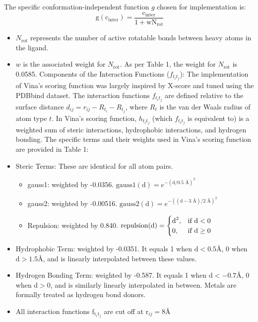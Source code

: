 \documentclass[11pt]{article}
\begin{document}
The specific conformation-independent function $g$ chosen for implementation is: 
\begin{equation} \label{eq:vinascoring-3}
\ \text{g}(\text{c}_{\text{inter}}) = \frac{\text{c}_{\text{inter}}}{1 + \text{wN}_{\text{rot}}}
\end{equation}
\begin{itemize}
\item $N_{\text{rot}}$ represents the number of active rotatable bonds between heavy atoms in the ligand.
\item $w$ is the associated weight for $N_{\text{rot}}$. As per Table 1, the weight for $N_{\text{rot}}$ is 0.0585.
Components of the Interaction Functions ($f_{t_i t_j}$): The implementation of Vina's scoring function was largely inspired by X-score and tuned using the PDBbind dataset. The interaction functions $f_{t_i t_j}$ are defined relative to the surface distance $d_{ij} = r_{ij} - R_{t_i} - R_{t_j}$, where $R_t$ is the van der Waals radius of atom type $t$. In Vina's scoring function, $h_{t_i t_j}$ (which $f_{t_i t_j}$ is equivalent to) is a weighted sum of steric interactions, hydrophobic interactions, and hydrogen bonding.
The specific terms and their weights used in Vina's scoring function are provided in Table 1:
\item Steric Terms: These are identical for all atom pairs.
\begin{itemize}
    \item gauss1: weighted by -0.0356. $\text{gauss1}(\text{d}) = e^{-(\text{d}/0.5\text{ Å})^2}$
    \item gauss2: weighted by -0.00516. $\text{gauss2}(\text{d}) = e^{-((\text{d}-3\text{ Å})/2\text{ Å})^2}$
    \item Repulsion: weighted by 0.840. $ \text{repulsion}(\text{d}) = 
                        \begin{cases} 
                        \text{d}^2, & \text{if } \text{d} < 0 \cr 0, & \text{if } \text{d} \geq 0 
                        \end{cases}$
\end{itemize}
\item Hydrophobic Term: weighted by -0.0351. It equals 1 when $\text{d} < 0.5${\AA}, 0 when $\text{d} > 1.5${\AA}, and is linearly interpolated between these values.
\item Hydrogen Bonding Term: weighted by -0.587. It equals 1 when $\text{d} < -0.7${\AA}, 0 when $\text{d} > 0$, and is similarly linearly interpolated in between. Metals are formally treated as hydrogen bond donors.
\item All interaction functions $\text{f}_{\text{t}_i \text{t}_j}$ are cut off at $\text{r}_{ij} = 8${\AA}
\end{itemize}
\end{document}
